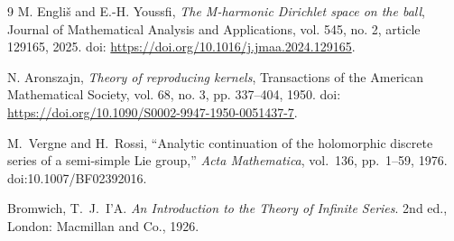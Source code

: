 \documentclass{article}
\theoremstyle{boldremark}
\renewcommand\[{\begin{equation}}
\renewcommand\]{\end{equation}}
\theoremstyle{definition}
\numberwithin{equation}{section}
\begin{document}
\begin{thebibliography}{9}
M. Engliš and E.-H. Youssfi,
\emph{The M-harmonic Dirichlet space on the ball},
Journal of Mathematical Analysis and Applications,
vol. 545, no. 2, article 129165, 2025.
doi: \url{https://doi.org/10.1016/j.jmaa.2024.129165}.

N. Aronszajn,
\emph{Theory of reproducing kernels},
Transactions of the American Mathematical Society,
vol. 68, no. 3, pp. 337--404, 1950.
doi: \url{https://doi.org/10.1090/S0002-9947-1950-0051437-7}.

M.~Vergne and H.~Rossi,
``Analytic continuation of the holomorphic discrete series of a semi-simple Lie group,''
\emph{Acta Mathematica}, vol.~136, pp.~1--59, 1976.
doi:10.1007/BF02392016.


Bromwich, T.~J.~I'A. \textit{An Introduction to the Theory of Infinite Series}. 2nd ed., London: Macmillan and Co., 1926.

\end{thebibliography}
\end{document}
